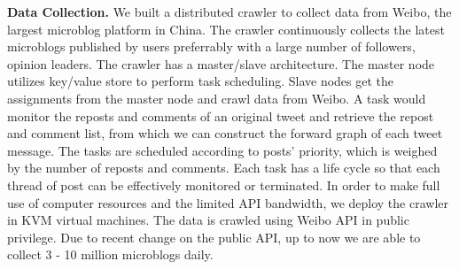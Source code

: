 

\noindent\textbf{Data Collection.}
We built a distributed crawler to collect data from Weibo, the largest microblog platform in China.
The crawler continuously collects the latest microblogs published by users preferrably with a large number of followers, \ie opinion leaders.
The crawler has a master/slave architecture.
The master node utilizes key/value store to perform task scheduling.
Slave nodes get the assignments from the master node and crawl data from Weibo.
A task would monitor the reposts and comments of an original tweet and retrieve the repost and comment list, 
from which we can construct the forward graph of each tweet message.
The tasks are scheduled according to posts' priority, which is weighed by the number of reposts and comments.
Each task has a life cycle so that each thread of post can be effectively monitored or terminated.
In order to make full use of computer resources and the limited API bandwidth, we deploy the crawler in KVM virtual machines.
The data is crawled using Weibo API in public privilege. 
Due to recent change on the public API, up to now we are able to collect 3 - 10 million microblogs daily.
